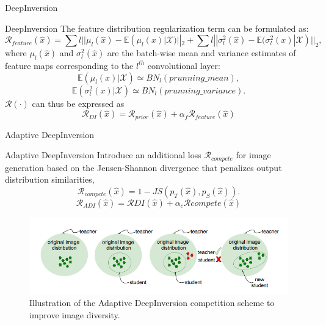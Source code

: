\documentclass{beamer}
\begin{document}
\begin{frame}{DeepInversion}
\centering 
\begin{block}{DeepInversion}
    The feature distribution regularization term can be formulated as:
$$\mathscr{R}_{feature}(\hat{x}) = \displaystyle\sum{l} || \mu_{l}(\hat{x})-\mathbb{E}(\mu_{l}(x)|\mathscr{X})||_2 + \displaystyle\sum{l}||\sigma^2_l(\hat{x})-\mathbb{E}(\sigma^2_l(x)|\mathscr{X})||_2,$$
where $\mu_l(\hat{x})$ and $\sigma^2_l(\hat{x})$ are the batch-wise mean and variance
estimates of feature maps corresponding to the $l^{th}$ convolutional layer:
$$\mathbb{E}(\mu_{l}(x)|\mathscr{X}) \simeq BN_{l}(prunning\_mean), $$
$$ \mathbb{E}(\sigma^2_l(x)|\mathscr{X}) \simeq BN_{l}(prunning\_variance). $$
$\mathscr{R}(\cdot)$ can thus be expressed as
$$\mathscr{R}_{DI}(\hat{x})=\mathscr{R}_{prior}(\hat{x}) + \alpha_f \mathscr{R}_{feature}(\hat{x}) $$
\end{block}
\end{frame}

\begin{frame}{Adaptive DeepInversion}
\centering 

\begin{block}{Adaptive DeepInversion}
    Introduce an additional loss $\mathscr{R}_{compete}$ for image generation based on the Jensen-Shannon divergence that penalizes output distribution similarities,
$$\mathscr{R}_{compete}(\hat{x}) = 1 - JS(p_T(\hat{x}), p_S(\hat{x})). $$
$$\mathscr{R}_{ADI}(\hat{x}) = \mathscr{R}{DI}(\hat{x}) + \alpha_c \mathscr{R}{compete}(\hat{x})$$
\end{block}


\begin{figure}
        \centering
        \includegraphics[scale=0.7]{images/distill_2.png}
        \caption{Illustration of the Adaptive DeepInversion competition
scheme to improve image diversity.}
    \end{figure}
 
\end{frame}
\end{document}
